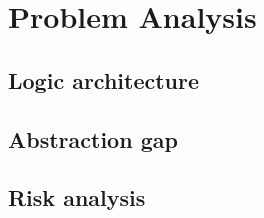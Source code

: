 \section{Problem Analysis}
\subsection{Logic architecture}
\subsection{Abstraction gap}
\subsection{Risk analysis}

